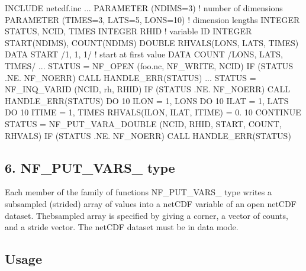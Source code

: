 I\+N\+C\+L\+U\+DE \textquotesingle{}netcdf.\+inc\textquotesingle{} ... P\+A\+R\+A\+M\+E\+T\+ER (N\+D\+I\+MS=3) ! number of dimensions P\+A\+R\+A\+M\+E\+T\+ER (T\+I\+M\+ES=3, L\+A\+TS=5, L\+O\+NS=10) ! dimension lengths I\+N\+T\+E\+G\+ER S\+T\+A\+T\+US, N\+C\+ID, T\+I\+M\+ES I\+N\+T\+E\+G\+ER R\+H\+ID ! variable ID I\+N\+T\+E\+G\+ER S\+T\+A\+R\+T(\+N\+D\+I\+M\+S), C\+O\+U\+N\+T(\+N\+D\+I\+M\+S) D\+O\+U\+B\+LE R\+H\+V\+A\+L\+S(\+L\+O\+N\+S, L\+A\+T\+S, T\+I\+M\+E\+S) D\+A\+TA S\+T\+A\+RT /1, 1, 1/ ! start at first value D\+A\+TA C\+O\+U\+NT /\+L\+O\+NS, L\+A\+TS, T\+I\+M\+E\+S/ ... S\+T\+A\+T\+US = N\+F\+\_\+\+O\+P\+EN (\textquotesingle{}foo.\+nc\textquotesingle{}, N\+F\+\_\+\+W\+R\+I\+TE, N\+C\+ID) IF (S\+T\+A\+T\+US .NE. N\+F\+\_\+\+N\+O\+E\+RR) C\+A\+LL H\+A\+N\+D\+L\+E\+\_\+\+E\+R\+R(\+S\+T\+A\+T\+U\+S) ... S\+T\+A\+T\+US = N\+F\+\_\+\+I\+N\+Q\+\_\+\+V\+A\+R\+ID (N\+C\+ID, \textquotesingle{}rh\textquotesingle{}, R\+H\+ID) IF (S\+T\+A\+T\+US .NE. N\+F\+\_\+\+N\+O\+E\+RR) C\+A\+LL H\+A\+N\+D\+L\+E\+\_\+\+E\+R\+R(\+S\+T\+A\+T\+U\+S) DO 10 I\+L\+ON = 1, L\+O\+NS DO 10 I\+L\+AT = 1, L\+A\+TS DO 10 I\+T\+I\+ME = 1, T\+I\+M\+ES R\+H\+V\+A\+L\+S(\+I\+L\+O\+N, I\+L\+A\+T, I\+T\+I\+M\+E) = 0. 10 C\+O\+N\+T\+I\+N\+UE S\+T\+A\+T\+US = N\+F\+\_\+\+P\+U\+T\+\_\+\+V\+A\+R\+A\+\_\+\+D\+O\+U\+B\+LE (N\+C\+ID, R\+H\+ID, S\+T\+A\+RT, C\+O\+U\+NT, R\+H\+V\+A\+LS) IF (S\+T\+A\+T\+US .NE. N\+F\+\_\+\+N\+O\+E\+RR) C\+A\+LL H\+A\+N\+D\+L\+E\+\_\+\+E\+R\+R(\+S\+T\+A\+T\+U\+S)

\subsection*{6. N\+F\+\_\+\+P\+U\+T\+\_\+\+V\+A\+R\+S\+\_\+ type }

Each member of the family of functions N\+F\+\_\+\+P\+U\+T\+\_\+\+V\+A\+R\+S\+\_\+ type writes a subsampled (strided) array of values into a net\+C\+DF variable of an open net\+C\+DF dataset. Thebsampled array is specified by giving a corner, a vector of counts, and a stride vector. The net\+C\+DF dataset must be in data mode.

\subsection*{Usage }

 

